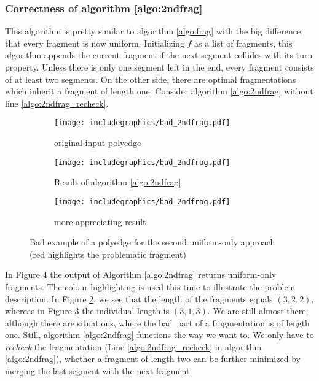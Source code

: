 \subsubsection*{Correctness of algorithm \ref{algo:2ndfrag}}
This algorithm is pretty similar to algorithm \ref{algo:frag} with the big difference, that every fragment is now uniform. Initializing $f$ as a list of fragments, this algorithm appends the current fragment if the next segment collides with its turn property. Unless there is only one segment left in the end, every fragment consists of at least two segments. On the other side, there are optimal fragmentations which inherit a fragment of length one. Consider algorithm \ref{algo:2ndfrag} without line \ref{algo:2ndfrag_recheck}.
\begin{figure}[H]
	\centering
	\begin{subfigure}{0.3\textwidth}
		\centering
		\texttt{[image: includegraphics/bad\_2ndfrag.pdf]}
		\caption{original input polyedge}\label{im:bad_2ndfrag1}
	\end{subfigure}
	\begin{subfigure}{0.3\textwidth}
		\centering
		\texttt{[image: includegraphics/bad\_2ndfrag.pdf]}
		
		\caption{Result of algorithm \ref{algo:2ndfrag}}\label{im:bad_2ndfrag2}
	\end{subfigure}
	\begin{subfigure}{0.3\textwidth}
		\centering
		\texttt{[image: includegraphics/bad\_2ndfrag.pdf]}
		\caption{more appreciating result}\label{im:bad_2ndfrag3}
	\end{subfigure}
	\caption{Bad example of a polyedge for the second uniform-only approach (red highlights the problematic fragment)}
	\label{im:bad_2ndfrag}
\end{figure}
In Figure \ref{im:bad_2ndfrag} the output of Algorithm \ref{algo:2ndfrag} returns uniform-only fragments. The colour highlighting is used this time to illustrate the problem description. In Figure \ref{im:bad_2ndfrag2}, we see that the length of the fragments equals $(3,2,2)$, whereas in Figure \ref{im:bad_2ndfrag3} the individual length is $(3,1,3)$. We are still almost there, although there are situations, where the \grqq bad\grqq~part of a fragmentation is of length one. Still, algorithm \ref{algo:2ndfrag} functions the way we want to. We only have to \textit{recheck} the fragmentation (Line \ref{algo:2ndfrag_recheck} in algorithm \ref{algo:2ndfrag}), whether a fragment of length two can be further minimized by merging the last segment with the next fragment.\\
